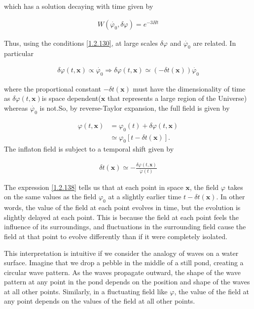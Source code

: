 which has a solution decaying with time given by

\begin{align}
    W(\dot{\varphi_0}, \delta \varphi )=e^{-3 H t}\label{1.2.135}
\end{align}

Thus, using the conditions \eqref{1.2.130}, at large scales $\delta \varphi$ and $\dot{\varphi_0}$ are related. In particular

\begin{align}
    \delta \varphi(t, \mathbf{x}) \propto \dot{\varphi_0} \Rightarrow \delta \varphi(t, \mathbf{x}) \simeq(-\delta t(\mathbf{x})) \dot{\varphi_0}\label{1.2.136}
\end{align}

where the proportional constant $-\delta t(\mathbf{x})$ must have the dimensionality of time as $\delta \varphi(t, \mathbf{x})$is space dependent($\mathbf{x}$ that represents a large region of the Universe) whereas $\dot{\varphi_0}$ is not.So, by reverse-Taylor expansion, the full field is given by


\begin{align}
    \varphi(t, \mathbf{x}) & =\varphi_{0}(t)+\delta \varphi(t, \mathbf{x}) \label{1.2.137}\\
    & \simeq \varphi_{0}[t-\delta t(\mathbf{x})] .\label{1.2.138}
\end{align}
The inflaton field is subject to a temporal shift given by

\begin{align}
\delta t(\mathbf{x}) \simeq-\frac{\delta \varphi(t, \mathbf{x})}{\dot{\varphi}(t)}\label{1.2.139}
\end{align}


The expression \eqref{1.2.138} tells us that at each point in space $\mathbf{x}$, the field $\varphi$ takes on the same values as the field $\varphi_{0}$ at a slightly earlier time $t-\delta t(\mathbf{x})$. In other words, the value of the field at each point evolves in time, but the evolution is slightly delayed at each point. This is because the field at each point feels the influence of its surroundings, and fluctuations in the surrounding field cause the field at that point to evolve differently than if it were completely isolated.

This interpretation is intuitive if we consider the analogy of waves on a water surface. Imagine that we drop a pebble in the middle of a still pond, creating a circular wave pattern. As the waves propagate outward, the shape of the wave pattern at any point in the pond depends on the position and shape of the waves at all other points. Similarly, in a fluctuating field like $\varphi$, the value of the field at any point depends on the values of the field at all other points.\

